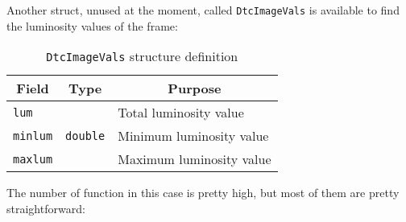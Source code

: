 \documentclass[a4paper,11pt]{memoir}
\begin{document}
Another struct, unused at the moment, called \texttt{DtcImageVals} is available to find the luminosity values of the frame:

\begin{table}[H]
\centering
\caption{\texttt{DtcImageVals} structure definition}
\label{my-label}
\begin{tabular}{|m{}|m{}|m{}|}
\hline
\multicolumn{1}{|c|}{\textbf{Field}} & \multicolumn{1}{c|}{\textbf{Type}} & \multicolumn{1}{c|}{\textbf{Purpose}} \\ \hline
\texttt{lum} & \multirow{3}{*}{\texttt{double}} & Total luminosity value \\ \cline{1-1} \cline{3-3}
\texttt{minlum} & & Minimum luminosity value \\ \cline{1-1} \cline{3-3}
\texttt{maxlum} & & Maximum luminosity value \\ \hline
\end{tabular}
\end{table}

The number of function in this case is pretty high, but most of them are pretty straightforward:
\end{document}
